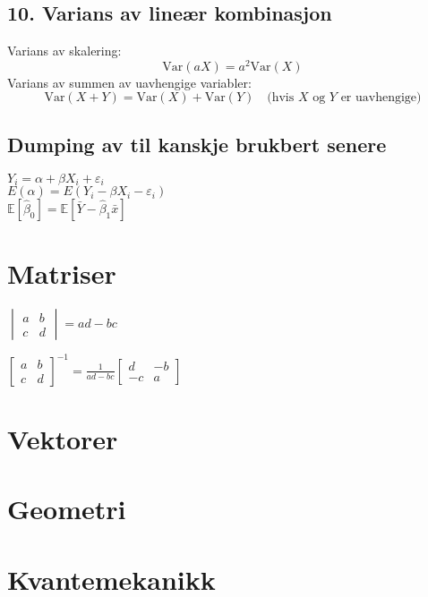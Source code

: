 \documentclass[a4paper,7pt,fleqn]{article}
\begin{document}
\begin{multicols}{2}
\begin{minipage}{\linewidth}
    \subsection*{10. Varians av lineær kombinasjon}
    Varians av skalering:
    \[
    \text{Var}(aX) = a^2\text{Var}(X)
    \]
    Varians av summen av uavhengige variabler:
    \[
    \text{Var}(X + Y) = \text{Var}(X) + \text{Var}(Y) \quad \text{(hvis \(X\) og \(Y\) er uavhengige)}
    \]
\end{minipage}

\subsection{Dumping av til kanskje brukbert senere}

\(Y_i = \alpha + \beta X_i + \varepsilon_i\)\\
\(E(\alpha) = E(Y_i - \beta X_i - \varepsilon_i)\)\\
\(\mathbb{E} \left[ \hat{\beta}_0 \right] = \mathbb{E} \left[ \bar{Y} - \hat{\beta}_1 \bar{x} \right]\)\\


\end{multicols}


\newpage
\section{Matriser}
\(  
\begin{vmatrix}  
a & b \\  
c & d  
\end{vmatrix} = ad - bc  
\)  

\(
\begin{bmatrix}  
a & b \\  
c & d  
\end{bmatrix}^{-1} =  
\frac{1}{ad - bc}  
\begin{bmatrix}  
d & -b \\  
-c & a  
\end{bmatrix}  
\)  


\newpage
\section{Vektorer}

\newpage
\section{Geometri}

\newpage
\section{Kvantemekanikk}
\end{document}

